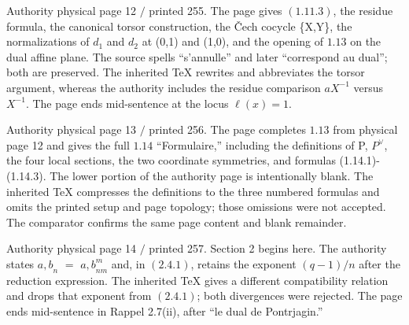 \documentclass[10pt,a4paper]{article}
\begin{document}
\clearpage
{}
\label{d035-physical-012}
\par Authority physical page 12 $/$ printed 255. The page gives $(1.11.3)$, the residue formula, the canonical torsor construction, the Čech cocycle \{X,Y\}, the normalizations of $d_1$ and $d_2$ at (0,1) and (1,0), and the opening of $1.13$ on the dual affine plane. The source spells ``s'annulle'' and later ``correspond au dual''; both are preserved. The inherited TeX rewrites and abbreviates the torsor argument, whereas the authority includes the residue comparison $aX^{-1}$ versus $X^{-1}$. The page ends mid-sentence at the locus $\ell{}(x)=1$.\par

\clearpage
{}
\label{d035-physical-013}
\par Authority physical page 13 $/$ printed 256. The page completes $1.13$ from physical page 12 and gives the full $1.14$ ``Formulaire,'' including the definitions of P, $P^\vee{}$, the four local sections, the two coordinate symmetries, and formulas (1.14.1)-(1.14.3). The lower portion of the authority page is intentionally blank. The inherited TeX compresses the definitions to the three numbered formulas and omits the printed setup and page topology; those omissions were not accepted. The comparator confirms the same page content and blank remainder.\par

\clearpage
{}
\label{d035-physical-014}
\par Authority physical page 14 $/$ printed 257. Section 2 begins here. The authority states ${a,b}_n$ $=$ ${a,b}_{nm}^m$ and, in $(2.4.1)$, retains the exponent $(q-1)/n$ after the reduction expression. The inherited TeX gives a different compatibility relation and drops that exponent from $(2.4.1)$; both divergences were rejected. The page ends mid-sentence in Rappel 2.7(ii), after ``le dual de Pontrjagin.''\par
\end{document}
